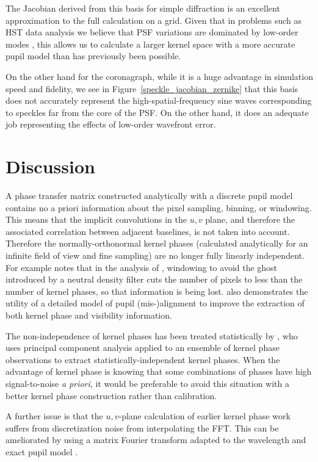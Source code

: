 \documentclass[modern]{aastex63}
\begin{document}
The Jacobian derived from this basis for simple diffraction is an excellent approximation to the full calculation on a grid. Given that in problems such as HST data analysis we believe that PSF variations are dominated by low-order modes \citep{pope13}, this allows us to calculate a larger kernel space with a more accurate pupil model than has previously been possible. 

On the other hand for the coronagraph, while it is a huge advantage in simulation speed and fidelity, we see in Figure~\ref{speckle_jacobian_zernike} that this basis does not accurately represent the high-spatial-frequency sine waves corresponding to speckles far from the core of the PSF. On the other hand, it does an adequate job representing the effects of low-order wavefront error. 

\section{Discussion}
\label{sec:discussion}

A phase transfer matrix constructed analytically with a discrete pupil model contains no a priori information about the pixel sampling, binning, or windowing. This means that the implicit convolutions in the $u,v$ plane, and therefore the associated correlation between adjacent baselines, is not taken into account.  Therefore the normally-orthonormal kernel phases (calculated analytically for an infinite field of view and fine sampling) are no longer fully linearly independent. For example \citet{martinache20} notes that in the analysis of \citet{palomar}, windowing to avoid the ghost introduced by a neutral density filter cuts the number of pixels to less than the number of kernel phases, so that information is being lost. \citet{martinache20} also demonstrates the utility of a detailed model of pupil (mis-)alignment to improve the extraction of both kernel phase and visibility information.

The non-independence of kernel phases has been treated statistically by \citet{ireland13}, who uses principal component analysis applied to an ensemble of kernel phase observations to extract statistically-independent kernel phases. When the advantage of kernel phase is knowing that some combinations of phases have high signal-to-noise \textit{a priori}, it would be preferable to avoid this situation with a better kernel phase construction rather than calibration.

A further issue is that the $u,v$-plane calculation of earlier kernel phase work suffers from discretization noise from interpolating the FFT. This can be ameliorated by using a matrix Fourier transform adapted to the wavelength and exact pupil model \citep{martinache_habilitation}.
\end{document}
